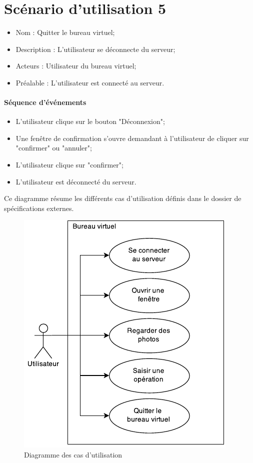 
\section{Scénario d'utilisation 5}
\begin{itemize}
	\item Nom : Quitter le bureau virtuel;
	\item Description : L'utilisateur se déconnecte du serveur;
	\item Acteurs : Utilisateur du bureau virtuel;
	\item Préalable : L'utilisateur est connecté  au serveur.
\end{itemize}

\paragraph{Séquence d'événements}
\begin{itemize}
	\item L'utilisateur clique sur le bouton "Déconnexion";
	\item Une fenêtre de confirmation s'ouvre demandant à l'utilisateur de cliquer sur "confirmer" ou "annuler";
	\item L'utilisateur clique sur "confirmer";
	\item L'utilisateur est déconnecté du serveur.
\end{itemize}

{\color{red}
Ce diagramme résume les différents cas d'utilisation définis dans le dossier de spécifications externes.

\begin{figure}[H]
	\centering
	\includegraphics[scale=0.8]{diagrammes/DCU.pdf}
	\caption{Diagramme des cas d'utilisation}
\end{figure}
}